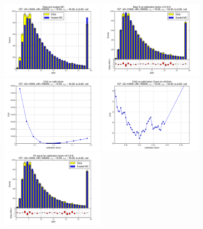 
 \begin{figure}[htbp] \begin{center} 
\includegraphics[width=0.45\textwidth]{../FIGURES/157/FIG_Data_and_scaled_MC.pdf} 
\includegraphics[width=0.45\textwidth]{../FIGURES/157/FIG_Best_fit_at_calibration_factor_of_0_910.pdf} 
\includegraphics[width=0.45\textwidth]{../FIGURES/157/FIG_Chi2_vs_calib_factor.pdf} 
\includegraphics[width=0.45\textwidth]{../FIGURES/157/FIG_Chi2_vs_calib_factor_Zoom_on_chi2min.pdf} 
\includegraphics[width=0.45\textwidth]{../FIGURES/157/FIG_Fit_result_for_calibration_factor_of_0_919.pdf} 

\end{center}
\end{figure}
